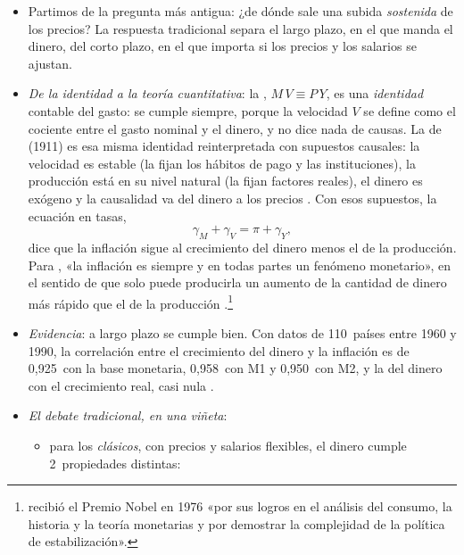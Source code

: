 \documentclass[11pt]{article}
\begin{document}
\begin{itemize}
\item Partimos de la pregunta más antigua: ¿de dónde sale una subida \emph{sostenida} de los precios? La respuesta tradicional separa el largo plazo, en el que manda el dinero, del corto plazo, en el que importa si los precios y los salarios se ajustan.
\item \emph{De la identidad a la teoría cuantitativa}: la , $M\,V\equiv P\,Y$, es una \emph{identidad} contable del gasto: se cumple siempre, porque la velocidad $V$ se define como el cociente entre el gasto nominal y el dinero, y no dice nada de causas. La  de  (1911) es esa misma identidad reinterpretada con supuestos causales: la velocidad es estable (la fijan los hábitos de pago y las instituciones), la producción está en su nivel natural (la fijan factores reales), el dinero es exógeno y la causalidad va del dinero a los precios  . Con esos supuestos, la ecuación en tasas,
  \begin{equation}\label{eq:cuantitativa}
  \gamma_M+\gamma_V=\pi+\gamma_Y ,
  \end{equation}
  dice que la inflación sigue al crecimiento del dinero menos el de la producción. Para \textcite{Friedman1963Inflation}, «la inflación es siempre y en todas partes un fenómeno monetario», en el sentido de que solo puede producirla un aumento de la cantidad de dinero más rápido que el de la producción\nocite{Friedman1970Counter} .\footnote{ recibió el Premio Nobel en 1976 «por sus logros en el análisis del consumo, la historia y la teoría monetarias y por demostrar la complejidad de la política de estabilización»\nocite{Nobel1976Friedman}.}
\item \emph{Evidencia}: a largo plazo se cumple bien. Con datos de 110~países entre 1960 y 1990, la correlación entre el crecimiento del dinero y la inflación es de 0,925~con la base monetaria, 0,958~con M1 y 0,950~con M2, y la del dinero con el crecimiento real, casi nula\nocite{McCandlessWeber1995} .
\item \emph{El debate tradicional, en una viñeta}\nocite{Serletis2007Demand}:
  \begin{itemize}
  \item para los \emph{clásicos}, con precios y salarios flexibles, el dinero cumple 2~propiedades distintas:
    \begin{itemize}

\end{itemize}
\end{itemize}
\end{itemize}
\end{document}
